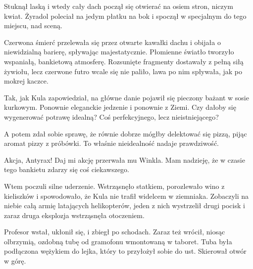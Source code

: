Stuknął laską i wtedy cały dach począł się otwierać na osiem stron, niczym kwiat. 
Żyradol poleciał na jedym płatku na bok i spoczął w specjalnym do tego miejscu, nad sceną.

Czerwona śmierć przelewała się przez otwarte kawałki dachu i obijała o niewidzialną barierę, spływając majestatycznie.
Płomienne światło tworzyło wspaniałą, bankietową atmosferę.
Rozsunięte fragmenty dostawały z pełną siłą żywiołu, lecz czerwone futro wcale się nie paliło, lawa po nim spływała, jak po mokrej kaczce.

Tak, jak Kula zapowiedział, na główne danie pojawił się pieczony bażant w sosie kurkowym.
Ponownie eleganckie jedzenie i ponownie z Ziemi. 
Czy dałoby się wygenerować potrawę idealną? 
Coś perfekcyjnego, lecz nieistniejącego?

A potem zdał sobie sprawę, że równie dobrze mógłby delektować się pizzą, pijąc aromat pizzy z próbówki.
To właśnie nieidealność nadaje prawdziwość.

\divider{} 

\begin{dialogue}
\ds{} Akcja, Antyrax! Daj mi akcję \dm{} przerwała mu Winkla. \dm{} Mam nadzieję, że w czasie tego bankietu zdarzy się coś ciekawszego.
\end{dialogue}

\divider{}

Wtem poczuli silne uderzenie. Wstrząsnęło statkiem, porozlewało wino z kieliszków i spowodowało, że Kula nie trafił widelcem w ziemniaka.
Zobaczyli na niebie całą armię latających helikopterów, jeden z nich wystrzelił drugi pocisk i zaraz druga eksplozja wstrząsnęła otoczeniem.

Profesor wstał, ukłonił się, i zbiegł po schodach. Zaraz też wrócił, niosąc olbrzymią, ozdobną tubę od gramofonu wmontowaną w taboret. 
Tuba była podłączona wężykiem do lejka, który to przyłożył sobie do ust.
Skierował otwór w górę.

